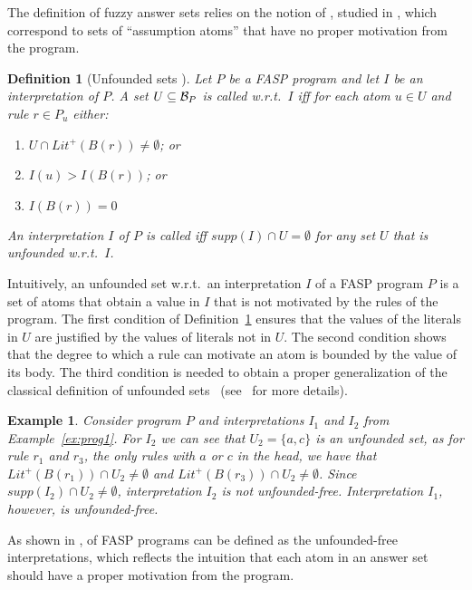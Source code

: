\documentclass{tlp}
\newcommand{\hbase}[1]{{\ensuremath{{\cal B}_{#1}}}}
\newcommand{\body}[1]{\ensuremath{B(#1)}}
\newcommand{\poslit}[1]{\ensuremath{Lit^{+}(#1)}}
\newcommand{\posbody}[1]{\ensuremath{\poslit{\body{#1}}}}
\newcommand{\supp}[1]{\ensuremath{\mathit{supp}(#1)}}
\newtheorem{definition}{Definition}
\newtheorem{example}{Example}
\begin{document}
The definition of fuzzy answer sets relies on the notion of , studied in \cite{FASP:amai}, which correspond to sets of ``assumption atoms'' that have no proper motivation from the program.

\begin{definition}[Unfounded sets \cite{FASP:amai}]\label{def:unfounded}
 Let $P$ be a FASP program and let $I$ be an interpretation of $P$. A set $U \subseteq \hbase{P}$ is called  w.r.t.~$I$ iff for each atom $u \in U$ and rule $r \in P_u$ either:
  \begin{enumerate}
   \item $U \cap \posbody{r} \neq \emptyset$; or
   \item $I(u) > I(\body{r})$; or
   \item $I(\body{r}) = 0$
  \end{enumerate}
 An interpretation $I$ of $P$ is called  iff $\supp{I} \cap U = \emptyset$ for any set $U$ that is unfounded w.r.t.~$I$.
\end{definition}

Intuitively, an unfounded set w.r.t.~an interpretation $I$ of a FASP program $P$ is a set of atoms that obtain a value in $I$ that is not motivated by the rules of the program. The first condition of Definition~\ref{def:unfounded} ensures that the values of the literals in $U$ are justified by the values of literals not in $U$.
 The second condition shows that the degree to which a rule can motivate an atom is bounded by the value of its body. The third condition is needed to obtain a proper generalization of the classical definition of unfounded sets~\cite{BaralBook} (see~\cite{FASP:amai} for more details).



\begin{example}\label{ex:prog1-unfounded}
 Consider program $P$ and interpretations $I_1$ and $I_2$ from Example~\ref{ex:prog1}. For $I_{2}$ we can see that $U_{2} = \{a,c\}$ is an unfounded set, as for rule $r_{1}$ and $r_{3}$, the only rules with $a$ or $c$ in the head, we have that $\posbody{r_{1}} \cap U_{2} \neq \emptyset$ and $\posbody{r_{3}} \cap U_{2} \neq \emptyset$. Since $\supp{I_{2}} \cap U_{2} \neq \emptyset$, interpretation $I_{2}$ is not unfounded-free. Interpretation $I_{1}$, however, is unfounded-free.
\end{example}




As shown in \cite{FASP:amai},  of FASP programs can be defined as the unfounded-free interpretations, which reflects the intuition that each atom in an answer set should have a proper motivation from the program.
\end{document}
